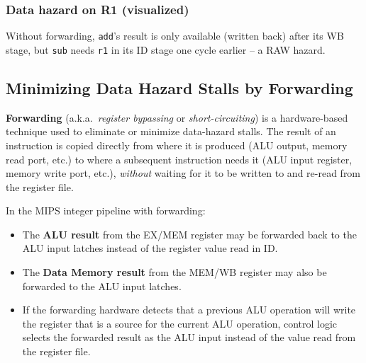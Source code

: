\subsubsection{Data hazard on R1 (visualized)}

\begin{center}
\end{center}
Without forwarding, \texttt{add}'s result is only available (written back)
after its WB stage, but \texttt{sub} needs \texttt{r1} in its ID stage one
cycle earlier -- a RAW hazard.

\subsection{Minimizing Data Hazard Stalls by Forwarding}

\begin{definition}[Forwarding]
\textbf{Forwarding} (a.k.a.\ \emph{register bypassing} or
\emph{short-circuiting}) is a hardware-based technique used to eliminate or
minimize data-hazard stalls. The result of an instruction is copied directly
from where it is produced (ALU output, memory read port, etc.) to where a
subsequent instruction needs it (ALU input register, memory write port,
etc.), \emph{without} waiting for it to be written to and re-read from the
register file.
\end{definition}

In the MIPS integer pipeline with forwarding:
\begin{itemize}
  \item The \textbf{ALU result} from the EX/MEM register may be forwarded
  back to the ALU input latches instead of the register value read in ID.
  \item The \textbf{Data Memory result} from the MEM/WB register may also be
  forwarded to the ALU input latches.
  \item If the forwarding hardware detects that a previous ALU operation
  will write the register that is a source for the current ALU operation,
  control logic selects the forwarded result as the ALU input instead of the
  value read from the register file.
\end{itemize}

